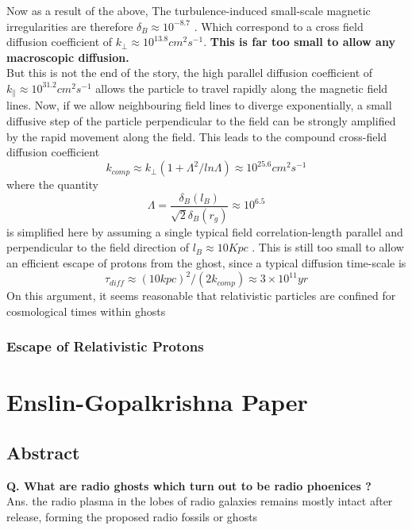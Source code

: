 \documentclass[11pt]{report}
\newcommand{\tbf}[1]{\textbf{#1}}
\begin{document}
  Now as a result of the above, The turbulence-induced small-scale magnetic irregularities are therefore  $\delta_B \approx 10^{-8.7}$ . Which correspond to a cross field diffusion coefficient of $k_\perp \approx 10^{13.8} cm^2s^{-1}$. \tbf{This is far too small to allow any macroscopic diffusion.}\\
  
  But this is not the end of the story, the high parallel diffusion coefficient of $k_\parallel \approx  10^{31.2} cm^2 s^{-1}$ allows the particle to travel rapidly along the magnetic field lines.  Now, if we allow neighbouring field lines to diverge exponentially, a small diffusive step of the particle perpendicular to the field can be strongly amplified by the rapid movement along the field.  This leads to the compound cross-field diffusion coefficient
  \begin{equation}
  k_{comp}\approx k_\perp (1+\Lambda^2/ln \Lambda) \approx 10^{25.6} cm^2 s^{-1}
  \end{equation}
  where the quantity
  \begin{equation}
  \Lambda=\frac{\delta_B(l_B)}{\sqrt{2}\delta_B(r_g)}\approx 10^{6.5}
  \end{equation}
  is simplified here by assuming a single typical field correlation-length parallel and perpendicular to the field direction of $l_B \approx 10Kpc$ . This is still too small to allow an efficient  escape of protons from the ghost, since a typical diffusion time-scale is 
  \begin{equation}
  \tau_{diff}\approx (10kpc)^2/(2k_{comp})\approx 3 \times 10^{11} yr
  \end{equation}
  On this argument, it seems reasonable that relativistic particles are confined for cosmological times within ghosts
  
  \subsection{Escape of Relativistic Protons}
  
\chapter{Enslin-Gopalkrishna Paper}
\section{Abstract}
	\tbf{Q. What are radio ghosts which turn out to be radio phoenices ?}\\
Ans.  the radio plasma in the lobes of radio galaxies remains mostly intact after release, forming the proposed radio fossils or ghosts\\
\end{document}
